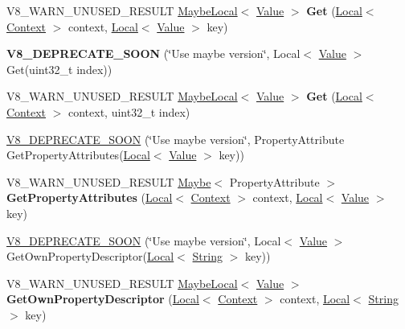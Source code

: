 \begin{DoxyCompactItemize}
\item 
\hypertarget{classv8_1_1Object_a239c03bb250cd6bf583ca60f72e18918}{}V8\+\_\+\+W\+A\+R\+N\+\_\+\+U\+N\+U\+S\+E\+D\+\_\+\+R\+E\+S\+U\+L\+T \hyperlink{classv8_1_1MaybeLocal}{Maybe\+Local}$<$ \hyperlink{classv8_1_1Value}{Value} $>$ {\bfseries Get} (\hyperlink{classv8_1_1Local}{Local}$<$ \hyperlink{classv8_1_1Context}{Context} $>$ context, \hyperlink{classv8_1_1Local}{Local}$<$ \hyperlink{classv8_1_1Value}{Value} $>$ key)\label{classv8_1_1Object_a239c03bb250cd6bf583ca60f72e18918}

\item 
\hypertarget{classv8_1_1Object_ac27f1b680e53d4c9c879aac3c7380202}{}{\bfseries V8\+\_\+\+D\+E\+P\+R\+E\+C\+A\+T\+E\+\_\+\+S\+O\+O\+N} (\char`\"{}Use maybe version\char`\"{}, Local$<$ \hyperlink{classv8_1_1Value}{Value} $>$ Get(uint32\+\_\+t index))\label{classv8_1_1Object_ac27f1b680e53d4c9c879aac3c7380202}

\item 
\hypertarget{classv8_1_1Object_ac1fcfcfedaf66775c46b53cb1804b949}{}V8\+\_\+\+W\+A\+R\+N\+\_\+\+U\+N\+U\+S\+E\+D\+\_\+\+R\+E\+S\+U\+L\+T \hyperlink{classv8_1_1MaybeLocal}{Maybe\+Local}$<$ \hyperlink{classv8_1_1Value}{Value} $>$ {\bfseries Get} (\hyperlink{classv8_1_1Local}{Local}$<$ \hyperlink{classv8_1_1Context}{Context} $>$ context, uint32\+\_\+t index)\label{classv8_1_1Object_ac1fcfcfedaf66775c46b53cb1804b949}

\item 
\hyperlink{classv8_1_1Object_a45c99c5e2b16425b4e92c88d49463e5f}{V8\+\_\+\+D\+E\+P\+R\+E\+C\+A\+T\+E\+\_\+\+S\+O\+O\+N} (\char`\"{}Use maybe version\char`\"{}, Property\+Attribute Get\+Property\+Attributes(\hyperlink{classv8_1_1Local}{Local}$<$ \hyperlink{classv8_1_1Value}{Value} $>$ key))
\item 
\hypertarget{classv8_1_1Object_ae5c97a596bcb634c50605a574358a9c6}{}V8\+\_\+\+W\+A\+R\+N\+\_\+\+U\+N\+U\+S\+E\+D\+\_\+\+R\+E\+S\+U\+L\+T \hyperlink{classv8_1_1Maybe}{Maybe}$<$ Property\+Attribute $>$ {\bfseries Get\+Property\+Attributes} (\hyperlink{classv8_1_1Local}{Local}$<$ \hyperlink{classv8_1_1Context}{Context} $>$ context, \hyperlink{classv8_1_1Local}{Local}$<$ \hyperlink{classv8_1_1Value}{Value} $>$ key)\label{classv8_1_1Object_ae5c97a596bcb634c50605a574358a9c6}

\item 
\hyperlink{classv8_1_1Object_ac5503b0a8e861ec721c680eccf5aec2d}{V8\+\_\+\+D\+E\+P\+R\+E\+C\+A\+T\+E\+\_\+\+S\+O\+O\+N} (\char`\"{}Use maybe version\char`\"{}, Local$<$ \hyperlink{classv8_1_1Value}{Value} $>$ Get\+Own\+Property\+Descriptor(\hyperlink{classv8_1_1Local}{Local}$<$ \hyperlink{classv8_1_1String}{String} $>$ key))
\item 
\hypertarget{classv8_1_1Object_a17fd31922f11c634183c59c0eb08cf65}{}V8\+\_\+\+W\+A\+R\+N\+\_\+\+U\+N\+U\+S\+E\+D\+\_\+\+R\+E\+S\+U\+L\+T \hyperlink{classv8_1_1MaybeLocal}{Maybe\+Local}$<$ \hyperlink{classv8_1_1Value}{Value} $>$ {\bfseries Get\+Own\+Property\+Descriptor} (\hyperlink{classv8_1_1Local}{Local}$<$ \hyperlink{classv8_1_1Context}{Context} $>$ context, \hyperlink{classv8_1_1Local}{Local}$<$ \hyperlink{classv8_1_1String}{String} $>$ key)\label{classv8_1_1Object_a17fd31922f11c634183c59c0eb08cf65}


\end{DoxyCompactItemize}
